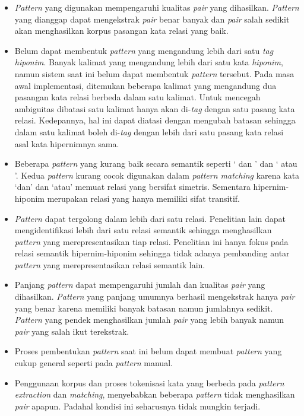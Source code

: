 \begin{itemize}
  \item \textit{Pattern} yang digunakan mempengaruhi kualitas \textit{pair} yang dihasilkan. \textit{Pattern} yang dianggap dapat mengekstrak \textit{pair} benar banyak dan \textit{pair} salah sedikit akan menghasilkan korpus pasangan kata relasi yang baik.
  \item Belum dapat membentuk \textit{pattern} yang mengandung lebih dari satu \textit{tag hiponim}. Banyak kalimat yang mengandung lebih dari satu kata \textit{hiponim}, namun sistem saat ini belum dapat membentuk \textit{pattern} tersebut. Pada masa awal implementasi, ditemukan beberapa kalimat yang mengandung dua pasangan kata relasi berbeda dalam satu kalimat. Untuk mencegah ambiguitas dibatasi satu kalimat hanya akan di-\textit{tag} dengan satu pasang kata relasi. Kedepannya, hal ini dapat diatasi dengan mengubah batasan sehingga dalam satu kalimat boleh di-\textit{tag} dengan lebih dari satu pasang kata relasi asal kata hipernimnya sama. 
  \item Beberapa \textit{pattern} yang kurang baik secara semantik seperti `{\tagHypernym} dan {\tagHyponym}' dan  `{\tagHypernym} atau {\tagHyponym}'. Kedua \textit{pattern} kurang cocok digunakan dalam \textit{pattern matching} karena kata `dan' dan `atau' memuat relasi yang bersifat simetris. Sementara hipernim-hiponim merupakan relasi yang hanya memiliki sifat transitif.
  \item \textit{Pattern} dapat tergolong dalam lebih dari satu relasi.   Penelitian lain dapat mengidentifikasi lebih dari satu relasi semantik sehingga menghasilkan \textit{pattern} yang merepresentasikan tiap relasi. Penelitian ini hanya fokus pada relasi semantik hipernim-hiponim sehingga tidak adanya pembanding antar \textit{pattern} yang merepresentasikan relasi semantik lain.
  \item Panjang \textit{pattern} dapat mempengaruhi jumlah dan kualitas \textit{pair} yang dihasilkan. \textit{Pattern} yang panjang umumnya berhasil mengekstrak hanya \textit{pair} yang benar karena memiliki banyak batasan namun jumlahnya sedikit. \textit{Pattern} yang pendek menghasilkan jumlah \textit{pair} yang lebih banyak namun \textit{pair} yang salah ikut terekstrak.
  \item Proses pembentukan \textit{pattern} saat ini belum dapat membuat \textit{pattern} yang cukup general seperti pada \textit{pattern} manual.
  \item Penggunaan korpus dan proses tokenisasi kata yang berbeda pada \textit{pattern extraction} dan \textit{matching}, menyebabkan beberapa \textit{pattern} tidak menghasilkan \textit{pair} apapun. Padahal kondisi ini seharusnya tidak mungkin terjadi.

\end{itemize}
